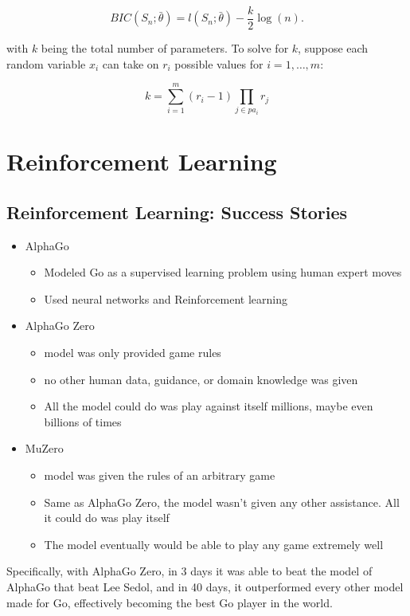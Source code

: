 \documentclass[12pt]{article}
\begin{document}
\[ BIC(S_n;\bar{\theta}) = l(S_n;\bar{\theta}) - \frac k 2 \log(n). \]

with $k$ being the total number of parameters. To solve for $k$, suppose each random variable $x_i$ can take on $r_i$ possible values for $i = 1, \dots, m$:

\[ k = \sum_{i=1}^m (r_i - 1) \prod_{j \in pa_i} r_j \]

\section{Reinforcement Learning}

\subsection{Reinforcement Learning: Success Stories}

\begin{itemize}
	\item AlphaGo
		\begin{itemize}
			\item Modeled Go as a supervised learning problem using human expert moves
			\item Used neural networks and Reinforcement learning
		\end{itemize}

	\item AlphaGo Zero
		\begin{itemize}
			\item model was only provided game rules
			\item no other human data, guidance, or domain knowledge was given
			\item All the model could do was play against itself millions, maybe even billions of times
		\end{itemize}

	\item MuZero
		\begin{itemize}
			\item model was given the rules of an arbitrary game
			\item Same as AlphaGo Zero, the model wasn't given any other assistance. All it could do was play itself
			\item The model eventually would be able to play any game extremely well
		\end{itemize}

\end{itemize}

Specifically, with AlphaGo Zero, in 3 days it was able to beat the model of AlphaGo that beat Lee Sedol, and in 40 days, it outperformed every other model made for Go, effectively becoming the best Go player in the world.\\
\end{document}
